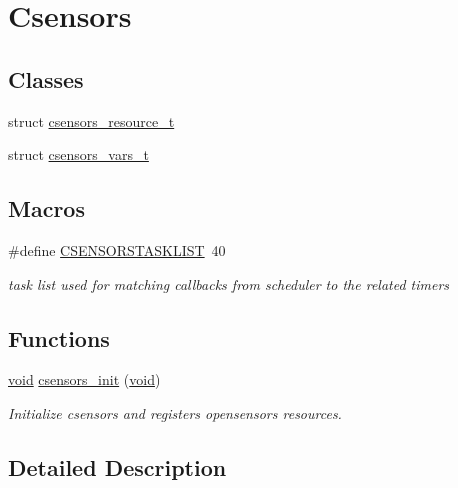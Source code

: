 \hypertarget{group__csensors}{}\section{Csensors}
\label{group__csensors}
\subsection*{Classes}
\begin{DoxyCompactItemize}
\item 
struct \hyperlink{structcsensors__resource__t}{csensors\+\_\+resource\+\_\+t}
\item 
struct \hyperlink{structcsensors__vars__t}{csensors\+\_\+vars\+\_\+t}
\end{DoxyCompactItemize}
\subsection*{Macros}
\begin{DoxyCompactItemize}
\item 
\#define \hyperlink{group__csensors_gaaf2582adb186074d7ca5110826e19687}{C\+S\+E\+N\+S\+O\+R\+S\+T\+A\+S\+K\+L\+I\+ST}~40
\begin{DoxyCompactList}\small\item\em task list used for matching callbacks from scheduler to the related timers \end{DoxyCompactList}\end{DoxyCompactItemize}
\subsection*{Functions}
\begin{DoxyCompactItemize}
\item 
\hyperlink{usb__devapi_8h_afabf60e7f57651d6d595a02c75f07cd0}{void} \hyperlink{group__csensors_ga0d77378b0fef4bfd3e7e2a08decf663c}{csensors\+\_\+init} (\hyperlink{usb__devapi_8h_afabf60e7f57651d6d595a02c75f07cd0}{void})
\begin{DoxyCompactList}\small\item\em Initialize csensors and registers opensensors resources. \end{DoxyCompactList}\end{DoxyCompactItemize}


\subsection{Detailed Description}


